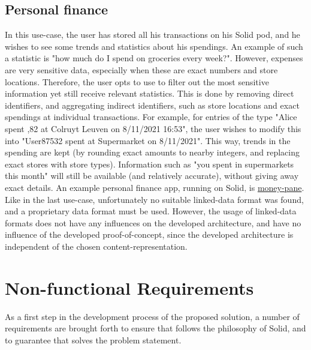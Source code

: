 \subsection{Personal finance}
In this use-case, the user has stored all his transactions on his Solid pod, and he wishes to see some trends and statistics about his spendings. An example of such a statistic is "how much do I spend on groceries every week?".  However, expenses are very sensitive data, especially when these are exact numbers and store locations. Therefore, the user opts to use \middleware{} to filter out the most sensitive information yet still receive relevant statistics. This is done by removing direct identifiers, and aggregating indirect identifiers, such as store locations and exact spendings at individual transactions.  For example, for entries of the type "Alice spent ,82 at Colruyt Leuven on 8/11/2021 16:53", the user wishes to modify this into "User87532 spent  at Supermarket on 8/11/2021". This way, trends in the spending are kept (by rounding exact amounts to nearby integers, and replacing exact stores with store types). Information such as "you spent  in supermarkets this month" will still be available (and relatively accurate), without giving away exact details. An example personal finance app, running on Solid, is \href{https://github.com/solid/money-pane}{money-pane}. Like in the last use-case, unfortunately no suitable linked-data format was found, and a proprietary data format must be used. 
However, the usage of linked-data formats does not have any influences on the developed architecture, and have no influence of the developed proof-of-concept, since the developed architecture is independent of the chosen content-representation.


\section{Non-functional Requirements}

As a first step in the development process of the proposed solution, a number of requirements are brought forth to ensure that \middleware{} follows the philosophy of Solid, and to guarantee that solves the problem statement.

